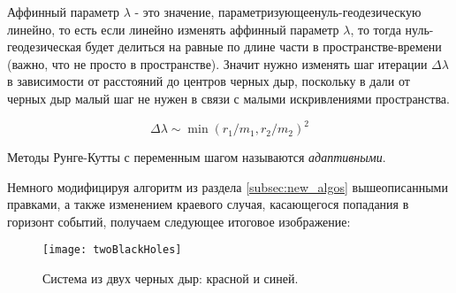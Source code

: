 Аффинный параметр $\lambda$ - это значение, параметризующее\linebreak нуль-геодезическую линейно, то есть если линейно изменять аффинный параметр $\lambda$, то тогда нуль-геодезическая будет делиться на равные по длине части в пространстве-времени (важно, что не просто в пространстве). Значит нужно изменять шаг итерации $\Delta\lambda$ в зависимости от расстояний до центров черных дыр, поскольку в дали от черных дыр малый шаг не нужен в связи с малыми искривлениями пространства.

\begin{equation}
    \Delta\lambda \sim \min{(r_1/m_1, r_2/m_2)}^2
\end{equation}

Методы Рунге-Кутты с переменным шагом называются \textit{адаптивными}.

Немного модифицируя алгоритм из раздела \ref{subsec:new_algos} вышеописанными правками, а также изменением краевого случая, касающегося попадания в горизонт событий, получаем следующее итоговое изображение:

\begin{figure}[h]
    \centering
    \texttt{[image: twoBlackHoles]}
    \caption{Система из двух черных дыр: красной и синей.}
    \label{fig:two_black_holes}
\end{figure}

\newpage